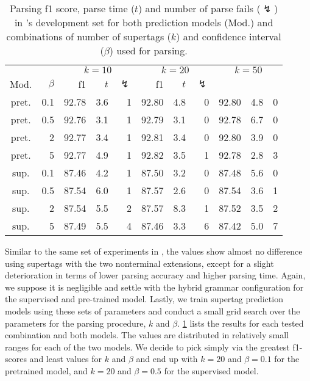 \documentclass[../../document.tex]{subfiles}
\begin{document}
    \begin{table}
        \caption{\label{tbl:experiments:tiger:k}
        Parsing f1 score, parse time ($t$) and number of parse fails ($\lightning$) in \tiger{}'s development set for both prediction models (Mod.) and combinations of number of supertags ($k$) and confidence interval ($\beta$) used for parsing.
        }
        \centering
        \setlength{\tabcolsep}{4pt}
        \vspace{.2cm}
        \begin{tabular}{cr|rrr|rrr|rrr}
            \toprule
&      &      \multicolumn{3}{c|}{$k = 10$} & \multicolumn{3}{c|}{$k = 20$} & \multicolumn{3}{c}{$k = 50$} \\
Mod. &  $\beta$  & f1 & $t$ & $\lightning$ & f1 & $t$ & $\lightning$ \\ \hline
pret. & 0.1  & 92.78 & 3.6 & 1 & 92.80 & 4.8 & 0 & 92.80 & 4.8 & 0 \\
pret. & 0.5  & 92.76 & 3.1 & 1 & 92.79 & 3.1 & 0 & 92.78 & 6.7 & 0 \\
pret. &   2  & 92.77 & 3.4 & 1 & 92.81 & 3.4 & 0 & 92.80 & 3.9 & 0 \\
pret. &   5  & 92.77 & 4.9 & 1 & 92.82 & 3.5 & 1 & 92.78 & 2.8 & 3 \\
\midrule 
sup. & 0.1  & 87.46 & 4.2 & 1 & 87.50 & 3.2 & 0 & 87.48 & 5.6 & 0 \\
sup. & 0.5  & 87.54 & 6.0 & 1 & 87.57 & 2.6 & 0 & 87.54 & 3.6 & 1 \\
sup. &   2  & 87.54 & 5.5 & 2 & 87.57 & 8.3 & 1 & 87.52 & 3.5 & 2 \\
sup. &   5  & 87.49 & 5.5 & 4 & 87.46 & 3.3 & 6 & 87.42 & 5.0 & 7 \\
    \bottomrule
        \end{tabular}
    \end{table}

    Similar to the same set of experiments in , the values show almost no difference using  supertags with the two nonterminal extensions, except for a slight deterioration in terms of lower parsing accuracy and higher parsing time.
    Again, we suppose it is negligible and settle with the hybrid grammar configuration for the supervised and pre-trained model.
    Lastly, we train supertag prediction models using these sets of parameters and conduct a small grid search over the parameters for the parsing procedure, $k$ and $\beta$.
    \cref{tbl:experiments:tiger:k} lists the results for each tested combination and both models.
    The values are distributed in relatively small ranges for each of the two models.
    We decide to pick simply via the greatest f1-scores and least values for \(k\) and \(\beta\) and end up with \(k=20\) and \(\beta=0.1\) for the pretrained model, and \(k=20\) and \(\beta=0.5\) for the supervised model.
\end{document}
